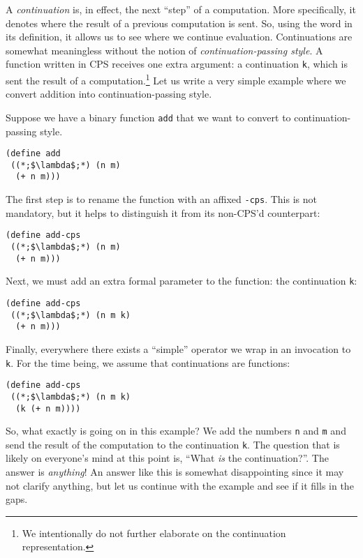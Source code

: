 A \textit{continuation} is, in effect, the next ``step'' of a computation. More specifically, it denotes where the result of a previous computation is sent. So, using the word in its definition, it allows us to see where we continue evaluation. Continuations are somewhat meaningless without the notion of \textit{continuation-passing style}. A function written in CPS receives one extra argument: a continuation \texttt{k}, which is sent the result of a computation.\footnote{We intentionally do not further elaborate on the continuation representation.} Let us write a very simple example where we convert addition into continuation-passing style.

Suppose we have a binary function \texttt{add} that we want to convert to continuation-passing style.

\begin{cl}[]{}\begin{lstlisting}[language=MyScheme]
(define add
 ((*;$\lambda$;*) (n m)
  (+ n m)))
\end{lstlisting}\end{cl}

The first step is to rename the function with an affixed \texttt{-cps}. This is not mandatory, but it helps to distinguish it from its non-CPS'd counterpart:
\begin{cl}[]{}\begin{lstlisting}[language=MyScheme]
(define add-cps
 ((*;$\lambda$;*) (n m)
  (+ n m)))
\end{lstlisting}\end{cl}
Next, we must add an extra formal parameter to the function: the continuation \texttt{k}:
\begin{cl}[]{}\begin{lstlisting}[language=MyScheme]
(define add-cps
 ((*;$\lambda$;*) (n m k)
  (+ n m)))
\end{lstlisting}\end{cl}
Finally, everywhere there exists a ``simple'' operator we wrap in an invocation to \texttt{k}. For the time being, we assume that continuations are functions:
\begin{cl}[]{}\begin{lstlisting}[language=MyScheme]
(define add-cps
 ((*;$\lambda$;*) (n m k)
  (k (+ n m))))
\end{lstlisting}\end{cl}
So, what exactly is going on in this example? We add the numbers \texttt{n} and \texttt{m} and send the result of the computation to the continuation \texttt{k}. The question that is likely on everyone's mind at this point is, ``What \textit{is} the continuation?''. The answer is \textit{anything}! An answer like this is somewhat disappointing since it may not clarify anything, but let us continue with the example and see if it fills in the gaps.

